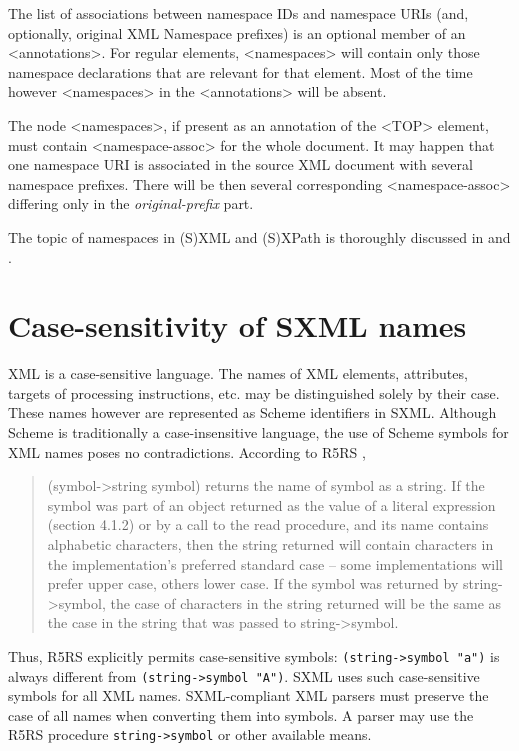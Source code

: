 \documentclass[10pt]{article}
\begin{document}
The list of associations between namespace IDs and namespace
URIs (and, optionally, original XML Namespace prefixes) is an optional
member of an <annotations>. For regular elements,
<namespaces> will contain only those namespace
declarations that are relevant for that element. Most of the time
however <namespaces> in the <annotations> will be absent.

The node <namespaces>, if present as an annotation
of the <TOP> element, must contain
<namespace-assoc> for the whole document. It may
happen that one namespace URI is associated in the source XML document
with several namespace prefixes. There will be then several
corresponding <namespace-assoc> differing only in
the {\itshape original-prefix} part.

The topic of namespaces in (S)XML and (S)XPath is thoroughly
discussed in \cite{Lisovsky-NS} and \cite{SXML-NS}.

\section{Case-sensitivity of SXML names}
XML is a case-sensitive language. The names of XML elements,
attributes, targets of processing instructions, etc. may be
distinguished solely by their case. These names however are
represented as Scheme identifiers in SXML. Although Scheme is
traditionally a case-insensitive language, the use of Scheme symbols
for XML names poses no contradictions. According to R5RS \cite{R5RS}, \begin{quote}
(symbol->string symbol) returns the name of symbol as a string. If
the symbol was part of an object returned as the value of a literal
expression (section 4.1.2) or by a call to the read procedure, and its
name contains alphabetic characters, then the string returned will
contain characters in the implementation's preferred standard
case -- some implementations will prefer upper case, others lower
case. If the symbol was returned by string->symbol, the case of
characters in the string returned will be the same as the case in the
string that was passed to string->symbol.\end{quote}


Thus, R5RS explicitly permits case-sensitive symbols: \texttt{(string->symbol "a")} is always different from \texttt{(string->symbol "A")}. SXML uses such case-sensitive symbols for
all XML names. SXML-compliant XML parsers must preserve the case of
all names when converting them into symbols. A parser may use the R5RS
procedure \texttt{string->symbol} or other available means.
\end{document}
